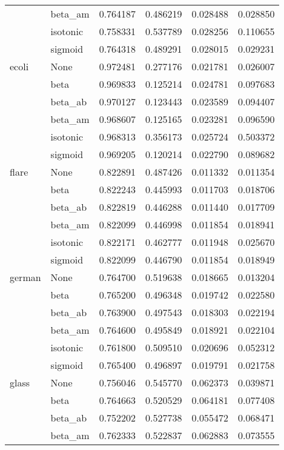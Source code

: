 \begin{tabular}{llrrrr}
        & beta\_am &  0.764187 &  0.486219 &  0.028488 &  0.028850 \\
        & isotonic &  0.758331 &  0.537789 &  0.028256 &  0.110655 \\
        & sigmoid &  0.764318 &  0.489291 &  0.028015 &  0.029231 \\
ecoli & None &  0.972481 &  0.277176 &  0.021781 &  0.026007 \\
        & beta &  0.969833 &  0.125214 &  0.024781 &  0.097683 \\
        & beta\_ab &  0.970127 &  0.123443 &  0.023589 &  0.094407 \\
        & beta\_am &  0.968607 &  0.125165 &  0.023281 &  0.096590 \\
        & isotonic &  0.968313 &  0.356173 &  0.025724 &  0.503372 \\
        & sigmoid &  0.969205 &  0.120214 &  0.022790 &  0.089682 \\
flare & None &  0.822891 &  0.487426 &  0.011332 &  0.011354 \\
        & beta &  0.822243 &  0.445993 &  0.011703 &  0.018706 \\
        & beta\_ab &  0.822819 &  0.446288 &  0.011440 &  0.017709 \\
        & beta\_am &  0.822099 &  0.446998 &  0.011854 &  0.018941 \\
        & isotonic &  0.822171 &  0.462777 &  0.011948 &  0.025670 \\
        & sigmoid &  0.822099 &  0.446790 &  0.011854 &  0.018949 \\
german & None &  0.764700 &  0.519638 &  0.018665 &  0.013204 \\
        & beta &  0.765200 &  0.496348 &  0.019742 &  0.022580 \\
        & beta\_ab &  0.763900 &  0.497543 &  0.018303 &  0.022194 \\
        & beta\_am &  0.764600 &  0.495849 &  0.018921 &  0.022104 \\
        & isotonic &  0.761800 &  0.509510 &  0.020696 &  0.052312 \\
        & sigmoid &  0.765400 &  0.496897 &  0.019791 &  0.021758 \\
glass & None &  0.756046 &  0.545770 &  0.062373 &  0.039871 \\
        & beta &  0.764663 &  0.520529 &  0.064181 &  0.077408 \\
        & beta\_ab &  0.752202 &  0.527738 &  0.055472 &  0.068471 \\
        & beta\_am &  0.762333 &  0.522837 &  0.062883 &  0.073555 \\

\end{tabular}
